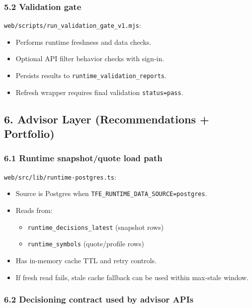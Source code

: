 \documentclass[
]{article}
\providecommand{\tightlist}{%
  \setlength{\itemsep}{0pt}\setlength{\parskip}{0pt}}
\begin{document}
\subsubsection{5.2 Validation gate}\label{52-validation-gate}

\texttt{web/scripts/run\_validation\_gate\_v1.mjs}:

\begin{itemize}
\tightlist
\item
  Performs runtime freshness and data checks.
\item
  Optional API filter behavior checks with sign-in.
\item
  Persists results to \texttt{runtime\_validation\_reports}.
\item
  Refresh wrapper requires final validation \texttt{status=pass}.
\end{itemize}

\subsection{6. Advisor Layer (Recommendations +
Portfolio)}\label{6-advisor-layer-recommendations--portfolio}

\subsubsection{6.1 Runtime snapshot/quote load
path}\label{61-runtime-snapshotquote-load-path}

\texttt{web/src/lib/runtime-postgres.ts}:

\begin{itemize}
\tightlist
\item
  Source is Postgres when \texttt{TFE\_RUNTIME\_DATA\_SOURCE=postgres}.
\item
  Reads from:

  \begin{itemize}
  \tightlist
  \item
    \texttt{runtime\_decisions\_latest} (snapshot rows)
  \item
    \texttt{runtime\_symbols} (quote/profile rows)
  \end{itemize}
\item
  Has in-memory cache TTL and retry controls.
\item
  If fresh read fails, stale cache fallback can be used within max-stale
  window.
\end{itemize}

\subsubsection{6.2 Decisioning contract used by advisor
APIs}\label{62-decisioning-contract-used-by-advisor-apis}
\end{document}
